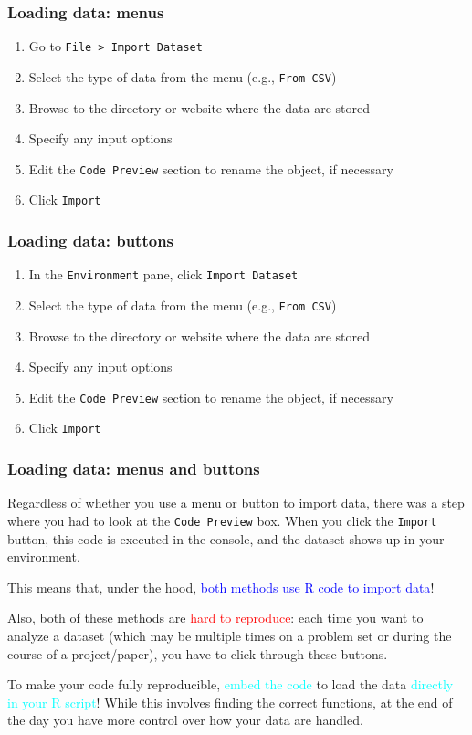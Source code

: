 \documentclass[11pt]{beamer}
\newcommand{\myframe}[1]{\begin{frame} \frametitle{#1}}
\begin{document}
\myframe{Loading data: menus}
\begin{enumerate}
\item Go to \texttt{File > Import Dataset}
\item Select the type of data from the menu (e.g., \texttt{From CSV})
\item Browse to the directory or website where the data are stored
\item Specify any input options
\item Edit the \texttt{Code Preview} section to rename the object, if necessary
\item Click \texttt{Import}
\end{enumerate}

\end{frame}

\myframe{Loading data: buttons}
\begin{enumerate}
\item In the \texttt{Environment} pane, click \texttt{Import Dataset}
\item Select the type of data from the menu (e.g., \texttt{From CSV})
\item Browse to the directory or website where the data are stored
\item Specify any input options
\item Edit the \texttt{Code Preview} section to rename the object, if necessary
\item Click \texttt{Import} 
\end{enumerate}
\end{frame}

\myframe{Loading data: menus and buttons}
Regardless of whether you use a menu or button to import data, there was a step where you had to look at the \texttt{Code Preview} box. When you click the \texttt{Import} button, this code is executed in the console, and the dataset shows up in your environment.

This means that, under the hood, \textcolor{blue}{both methods use R code to import data}! 

Also, both of these methods are \textcolor{red}{hard to reproduce}: each time you want to analyze a dataset (which may be multiple times on a problem set or during the course of a project/paper), you have to click through these buttons. 

To make your code fully reproducible, \textcolor{cyan}{embed the code} to load the data \textcolor{cyan}{directly in your R script}! While this involves finding the correct functions, at the end of the day you have more control over how your data are handled.
\end{frame}
\end{document}
